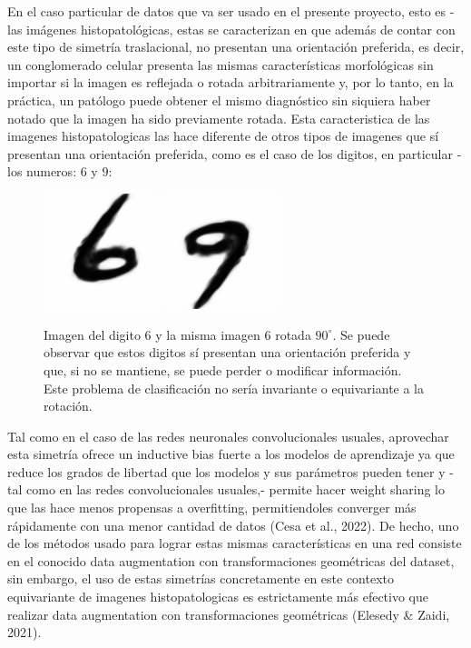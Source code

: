 \documentclass[12pt,letterpaper,final, openany]{scrbook}
\begin{document}
En el caso particular de datos que va ser usado en el presente proyecto, esto es - las imágenes histopatológicas, estas se caracterizan en que además de contar con este tipo de simetría traslacional, no presentan una orientación preferida, es decir, un conglomerado celular presenta las mismas características morfológicas sin importar si la imagen es reflejada o rotada arbitrariamente y, por lo tanto, en la práctica, un patólogo puede obtener el mismo diagnóstico sin siquiera haber notado que la imagen ha sido previamente rotada. Esta caracteristica de las imagenes histopatologicas las hace diferente de otros tipos de imagenes que sí presentan una orientación preferida, como es el caso de los digitos, en particular - los numeros: $6$ y $9$:
\begin{figure}[h!]
    \centering
    \includegraphics[width=0.3\textwidth]{6.png}
    \includegraphics[width=0.3\textwidth]{9.png}
    \caption{Imagen del digito $6$ y la misma imagen $6$ rotada $90 ^{\circ}$. Se puede observar que estos digitos sí presentan una orientación preferida y que, si no se mantiene, se puede perder o modificar información. Este problema de clasificación no sería invariante o equivariante a la rotación.}
    \label{fig:69}
\end{figure}
Tal como en el caso de las redes neuronales convolucionales usuales, aprovechar esta simetría ofrece un inductive bias fuerte a los modelos de aprendizaje ya que reduce los grados de libertad que los modelos y sus parámetros pueden tener y -tal como en las redes convolucionales usuales,- permite hacer weight sharing lo que las hace menos propensas a overfitting, permitiendoles converger más rápidamente con una menor cantidad de datos (Cesa et al., 2022). De hecho, uno de los métodos usado para lograr estas mismas características en una red consiste en el conocido data augmentation con transformaciones geométricas del dataset, sin embargo, el uso de estas simetrías concretamente en este contexto equivariante de imagenes histopatologicas es estrictamente más efectivo que realizar data augmentation con transformaciones geométricas (Elesedy \& Zaidi, 2021).
\end{document}
